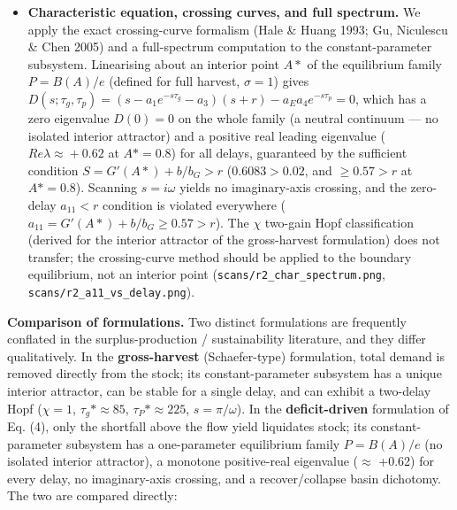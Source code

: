 \documentclass[11pt]{article}
\begin{document}
\begin{itemize}
\item \textbf{Characteristic equation, crossing curves, and full spectrum.} We apply the exact crossing-curve formalism (Hale \& Huang 1993; Gu, Niculescu \& Chen 2005) and a full-spectrum computation to the constant-parameter subsystem. Linearising about an interior point $A*$ of the equilibrium family $P=B(A)/e$ (defined for full harvest, $\sigma{} = 1$) gives $D(s;\tau{}_{g},\tau{}_{p})=(s-a_{1}e^{-s\tau{}_{g}}-a_{3})(s+r)-a_{E} a_{4}e^{-s\tau{}_{p}}=0$, which has a zero eigenvalue $D(0)=0$ on the whole family (a neutral continuum — no isolated interior attractor) and a positive real leading eigenvalue ($Re \lambda{} \approx{} +0.62$ at $A*=0.8$) for all delays, guaranteed by the sufficient condition $S = G\prime{}(A*) + b/b_{G} > r$ ($0.6083 > 0.02$, and $\geq{} 0.57 > r$ at $A*=0.8$). Scanning $s=i\omega{}$ yields no imaginary-axis crossing, and the zero-delay $a_{11}<r$ condition is violated everywhere ($a_{11}=G'(A*)+b/b_{G} \geq{} 0.57 > r$). The $\chi{}$ two-gain Hopf classification (derived for the interior attractor of the gross-harvest formulation) does not transfer; the crossing-curve method should be applied to the boundary equilibrium, not an interior point (\texttt{scans/r2\_char\_spectrum.png}, \texttt{scans/r2\_a11\_vs\_delay.png}).
\end{itemize}

\textbf{Comparison of formulations.} Two distinct formulations are frequently conflated in the surplus-production / sustainability literature, and they differ qualitatively. In the \textbf{gross-harvest} (Schaefer-type) formulation, total demand is removed directly from the stock; its constant-parameter subsystem has a unique interior attractor, can be stable for a single delay, and can exhibit a two-delay Hopf ($\chi{}=1$, $\tau{}_{g}*\approx{}85$, $\tau{}_{P}*\approx{}225$, $s=\pi{}/\omega{}$). In the \textbf{deficit-driven} formulation of Eq. (4), only the shortfall above the flow yield liquidates stock; its constant-parameter subsystem has a one-parameter equilibrium family $P = B(A)/e$ (no isolated interior attractor), a monotone positive-real eigenvalue (\ensuremath{\approx{}} +0.62) for every delay, no imaginary-axis crossing, and a recover/collapse basin dichotomy. The two are compared directly:
\end{document}
